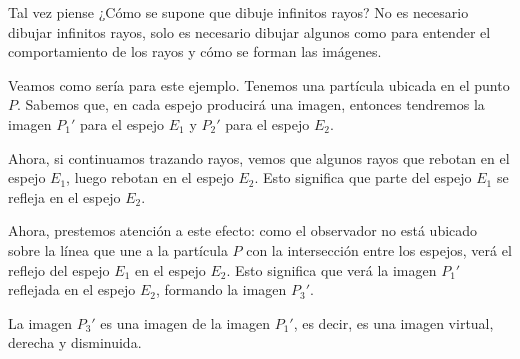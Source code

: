 Tal vez piense ¿Cómo se supone que dibuje infinitos rayos? No es necesario dibujar infinitos rayos, solo es necesario dibujar algunos como para entender el comportamiento de los rayos y cómo se forman las imágenes.

Veamos como sería para este ejemplo. Tenemos una partícula ubicada en el punto \(P\). Sabemos que, en cada espejo producirá una imagen, entonces tendremos la imagen \(P_1'\) para el espejo \(E_1\) y \(P_2'\) para el espejo \(E_2\).

Ahora, si continuamos trazando rayos, vemos que algunos rayos que rebotan en el espejo \(E_1\), luego rebotan en el espejo \(E_2\). Esto significa que parte del espejo \(E_1\) se refleja en el espejo \(E_2\).

Ahora, prestemos atención a este efecto: como el observador no está ubicado sobre la línea que une a la partícula \(P\) con la intersección entre los espejos, verá el reflejo del espejo \(E_1\) en el espejo \(E_2\). Esto significa que verá la imagen \(P_1'\) reflejada en el espejo \(E_2\), formando la imagen \(P_3'\).

La imagen \(P_3'\) es una imagen de la imagen \(P_1'\), es decir, es una imagen virtual, derecha y disminuida.